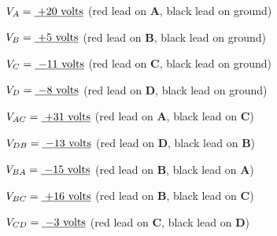 $V_A = \hbox{\underbar{ +20 volts}}$ (red lead on {\bf A}, black lead on ground)

\vskip 5pt

$V_B = \hbox{\underbar{ +5 volts}}$ (red lead on {\bf B}, black lead on ground)

\vskip 5pt

$V_C = \hbox{\underbar{ $-11$ volts}}$ (red lead on {\bf C}, black lead on ground)

\vskip 5pt

$V_D = \hbox{\underbar{ $-8$ volts}}$ (red lead on {\bf D}, black lead on ground)

\vskip 20pt

\goodbreak

$V_{AC} = \hbox{\underbar{ +31 volts}}$ (red lead on {\bf A}, black lead on {\bf C})

\vskip 5pt

$V_{DB} = \hbox{\underbar{ $-13$ volts}}$ (red lead on {\bf D}, black lead on {\bf B})

\vskip 5pt

$V_{BA} = \hbox{\underbar{ $-15$ volts}}$ (red lead on {\bf B}, black lead on {\bf A})

\vskip 5pt

$V_{BC} = \hbox{\underbar{ +16 volts}}$ (red lead on {\bf B}, black lead on {\bf C})

\vskip 5pt

$V_{CD} = \hbox{\underbar{ $-3$ volts}}$ (red lead on {\bf C}, black lead on {\bf D})







